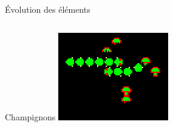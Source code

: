 \begin{frame}{Évolution des éléments}
\begin{columns}
\begin{column}{0.3\textwidth}
\begin{block}{Champignons}
				\smallskip
				\includegraphics[width=\textwidth]{imgs/champignonsEtCentipede.png}
			\end{block}
		\end{column}
	\end{columns}
\end{frame}
